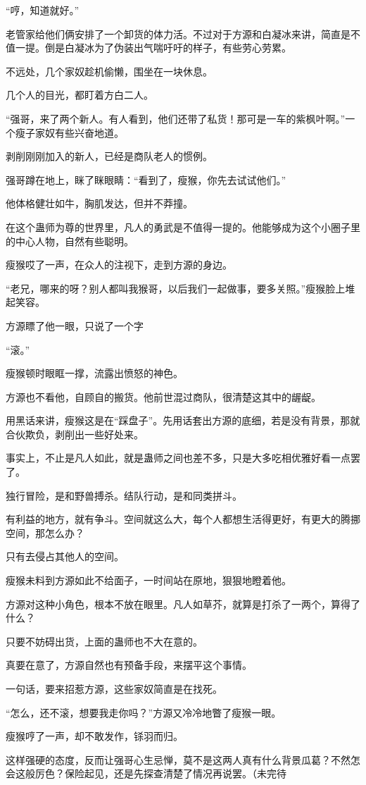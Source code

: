 \begin{this_body}
“哼，知道就好。”

老管家给他们俩安排了一个卸货的体力活。不过对于方源和白凝冰来讲，简直是不值一提。倒是白凝冰为了伪装出气喘吁吁的样子，有些劳心劳累。

不远处，几个家奴趁机偷懒，围坐在一块休息。

几个人的目光，都盯着方白二人。

“强哥，来了两个新人。有人看到，他们还带了私货！那可是一车的紫枫叶啊。”一个瘦子家奴有些兴奋地道。

剥削刚刚加入的新人，已经是商队老人的惯例。

强哥蹲在地上，眯了眯眼睛：“看到了，瘦猴，你先去试试他们。”

他体格健壮如牛，胸肌发达，但并不莽撞。

在这个蛊师为尊的世界里，凡人的勇武是不值得一提的。他能够成为这个小圈子里的中心人物，自然有些聪明。

瘦猴哎了一声，在众人的注视下，走到方源的身边。

“老兄，哪来的呀？别人都叫我猴哥，以后我们一起做事，要多关照。”瘦猴脸上堆起笑容。

方源瞟了他一眼，只说了一个字

“滚。”

瘦猴顿时眼眶一撑，流露出愤怒的神色。

方源也不看他，自顾自的搬货。他前世混过商队，很清楚这其中的龌龊。

用黑话来讲，瘦猴这是在“踩盘子”。先用话套出方源的底细，若是没有背景，那就合伙欺负，剥削出一些好处来。

事实上，不止是凡人如此，就是蛊师之间也差不多，只是大多吃相优雅好看一点罢了。

独行冒险，是和野兽搏杀。结队行动，是和同类拼斗。

有利益的地方，就有争斗。空间就这么大，每个人都想生活得更好，有更大的腾挪空间，那怎么办？

只有去侵占其他人的空间。

瘦猴未料到方源如此不给面子，一时间站在原地，狠狠地瞪着他。

方源对这种小角色，根本不放在眼里。凡人如草芥，就算是打杀了一两个，算得了什么？

只要不妨碍出货，上面的蛊师也不大在意的。

真要在意了，方源自然也有预备手段，来摆平这个事情。

一句话，要来招惹方源，这些家奴简直是在找死。

“怎么，还不滚，想要我走你吗？”方源又冷冷地瞥了瘦猴一眼。

瘦猴哼了一声，却不敢发作，铩羽而归。

这样强硬的态度，反而让强哥心生忌惮，莫不是这两人真有什么背景瓜葛？不然怎会这般厉色？保险起见，还是先探查清楚了情况再说罢。（未完待

\end{this_body}

